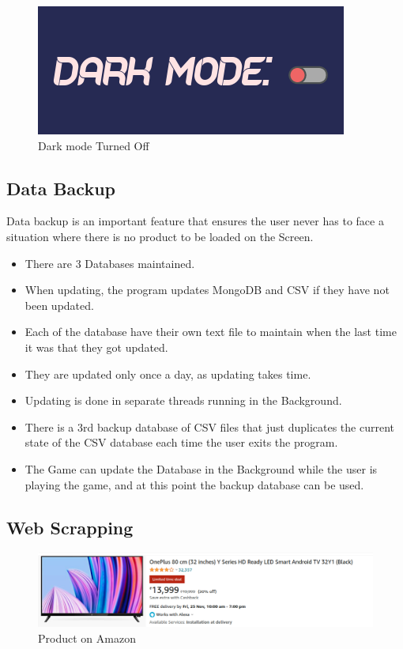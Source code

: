 \documentclass[11pt]{article}
\begin{document}
\begin{figure}[H]
\centering
\includegraphics[scale=0.5]{dark mode1.png}
\caption{Dark mode Turned Off}
\end{figure}
\subsection{Data Backup}
Data backup is an important feature that ensures the user never has to face a situation where there is no product to be loaded on the Screen. 
\begin{itemize}
	\item There are 3 Databases maintained. 
	\item When updating, the program updates MongoDB and CSV if they have not been updated. 
	\item Each of the database have their own text file to maintain when the last time it was that they got updated. 
	\item They are updated only once a day, as updating takes time. 
	\item Updating is done in separate threads running in the Background. 
	\item There is a 3rd backup database of CSV files that just duplicates the current state of the CSV database each time the user exits the program. 
	\item The Game can update the Database in the Background while the user is playing the game, and at this point the backup database can be used. 
\end{itemize}
\subsection{Web Scrapping}
\begin{figure}[H]
\centering
\includegraphics[scale=0.5]{amazon.png}
\caption{Product on Amazon}
\end{figure}
\end{document}
